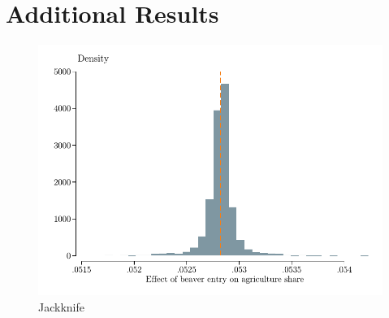 \documentclass[11pt, english, letterpaper]{article}
\begin{document}
\section{Additional Results}
\label{sec:addl_results}



\begin{figure}
    \centering
    \includegraphics[width=0.6\linewidth]{output/figures/jackknife_distribution_Soverall_river_cells_AC.pdf}
    \caption{Jackknife}
    \label{fig:est-main-jackknife}
\end{figure}
% 

%  
\end{document}
